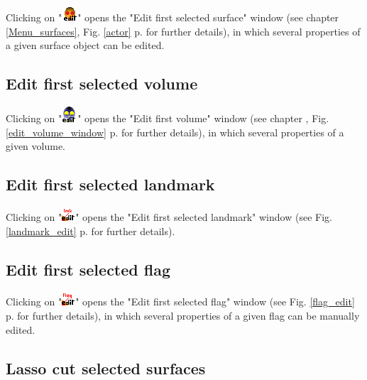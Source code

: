 Clicking on "\includegraphics[scale=0.7]{images/06/objects/actor_edit.png}" opens the "Edit first selected surface" window (see chapter \ref{Menu_surfaces}, Fig. \ref{actor} p.\pageref{actor_edit} for further details), in which several properties of a given surface object can be edited.


\subsection{Edit first selected volume}

Clicking on "\includegraphics[scale=0.7]{images/06/objects/volume_edit.png}" opens the "Edit first volume" window (see chapter \label{volumes_chapter}, Fig. \ref{edit_volume_window} p.\pageref{edit_volume_window} for further details), in which several properties of a given volume.



\subsection{Edit first selected landmark}
Clicking on "\includegraphics[scale=0.7]{images/06/objects/landmark_edit.png}" opens the "Edit first selected landmark" window (see Fig. \ref{landmark_edit} p.\pageref{landmark_edit} for further details). 





\subsection{Edit first selected flag}
Clicking on "\includegraphics[scale=0.7]{images/06/objects/flag_edit.png}" opens the "Edit first selected flag" window (see Fig. \ref{flag_edit} p.\pageref{flag_edit} for further details), in which several properties of a given flag can be manually edited.


\subsection{Lasso cut selected surfaces} \label{lasso_cut_section}

